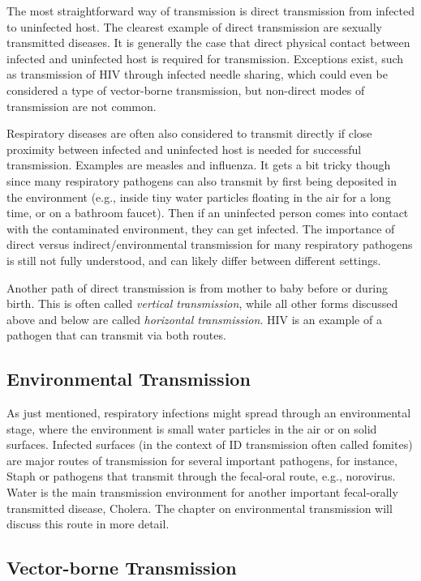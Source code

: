 \documentclass[]{article}
\theoremstyle{definition}
\theoremstyle{definition}
\theoremstyle{definition}
\theoremstyle{remark}
\begin{document}
The most straightforward way of transmission is direct transmission from
infected to uninfected host. The clearest example of direct transmission
are sexually transmitted diseases. It is generally the case that direct
physical contact between infected and uninfected host is required for
transmission. Exceptions exist, such as transmission of HIV through
infected needle sharing, which could even be considered a type of
vector-borne transmission, but non-direct modes of transmission are not
common.

Respiratory diseases are often also considered to transmit directly if
close proximity between infected and uninfected host is needed for
successful transmission. Examples are measles and influenza. It gets a
bit tricky though since many respiratory pathogens can also transmit by
first being deposited in the environment (e.g., inside tiny water
particles floating in the air for a long time, or on a bathroom faucet).
Then if an uninfected person comes into contact with the contaminated
environment, they can get infected. The importance of direct versus
indirect/environmental transmission for many respiratory pathogens is
still not fully understood, and can likely differ between different
settings.

Another path of direct transmission is from mother to baby before or
during birth. This is often called \emph{vertical transmission}, while
all other forms discussed above and below are called \emph{horizontal
transmission}. HIV is an example of a pathogen that can transmit via
both routes.

\subsection{Environmental
Transmission}\label{environmental-transmission}

As just mentioned, respiratory infections might spread through an
environmental stage, where the environment is small water particles in
the air or on solid surfaces. Infected surfaces (in the context of ID
transmission often called fomites) are major routes of transmission for
several important pathogens, for instance, Staph or pathogens that
transmit through the fecal-oral route, e.g., norovirus. Water is the
main transmission environment for another important fecal-orally
transmitted disease, Cholera. The chapter on environmental transmission
will discuss this route in more detail.

\subsection{Vector-borne Transmission}\label{vector-borne-transmission}
\end{document}

